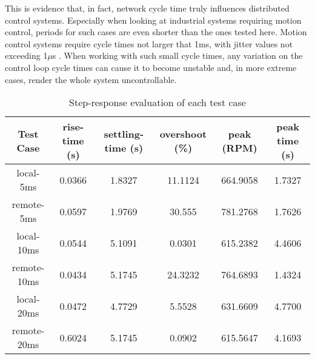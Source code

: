 This is evidence that, in fact, network cycle time truly influences distributed control systems.
Especially when looking at industrial systems requiring motion control, periods for such cases are even shorter than the ones tested here.
Motion control systems require cycle times not larger that 1ms, with jitter values not exceeding 1$\mu$s \cite{rte:rte-for-automation}.
When working with such small cycle times, any variation on the control loop cycle times can cause it to become unstable and, in more extreme cases, render the whole system uncontrollable.

\begin{table}[htp]
	\centering
	\caption{Step-response evaluation of each test case}
	\label{tab:step-analysis}
	\begin{tabular}{|c|c|c|c|c|c|}
		\hline
		Test Case   & rise-time (s) & settling-time (s) & overshoot (\%) & peak (RPM) & peak time (s) \\
		\hline
		local-5ms   & 0.0366 & 1.8327 & 11.1124 & 664.9058 & 1.7327 \\
		\hline
		remote-5ms  & 0.0597 & 1.9769 & 30.555 & 781.2768 & 1.7626 \\
		\hline
		local-10ms  & 0.0544 & 5.1091 & 0.0301 & 615.2382 & 4.4606 \\
		\hline
		remote-10ms & 0.0434 & 5.1745 & 24.3232 & 764.6893 & 1.4324 \\
		\hline
		local-20ms  & 0.0472 & 4.7729 & 5.5528 & 631.6609 & 4.7700 \\
		\hline
		remote-20ms & 0.6024 & 5.1745 & 0.0902 & 615.5647 & 4.1693 \\
		\hline
	\end{tabular}
\end{table}


